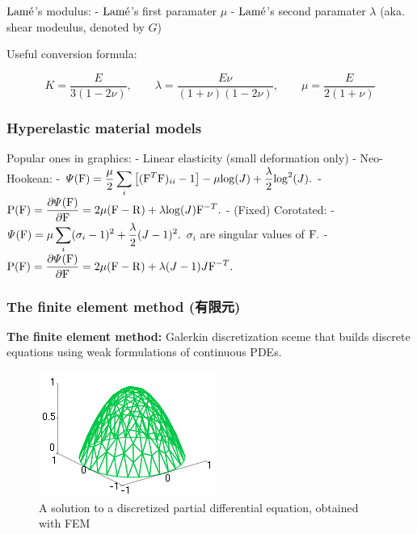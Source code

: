 \documentclass[11pt]{article}
\begin{document}
\(\rm Lam\acute{e}\)'s modulus: - \(\rm Lam\acute{e}\)'s first paramater
\(\mu\) - \(\rm Lam\acute{e}\)'s second paramater \(\lambda\) (aka.
shear modeulus, denoted by \(G\))

Useful conversion formula:

\begin{equation*}
K=\displaystyle\frac{E}{3(1-2\nu)},\qquad \lambda=\displaystyle\frac{E\nu}{(1+\nu)(1-2\nu)},\qquad \mu=\displaystyle\frac{E}{2(1+\nu)}
\end{equation*}

\hypertarget{hyperelastic-material-models}{%
\subsubsection{Hyperelastic material
models}\label{hyperelastic-material-models}}

Popular ones in graphics: - Linear elasticity (small deformation only) -
Neo-Hookean: -
\(\varPsi({\rm F})=\displaystyle\frac{\mu}{2}\sum_{i}  \left[({\rm F}^{T}{\rm F})_{ii}-1\right]  -\mu{\rm log}(J)+\displaystyle\frac{\lambda}{2}{\rm log}^{2}(J).\)
-
\({\rm P(F)}=\displaystyle\frac{\partial\varPsi({\rm F})}{\partial {\rm F}}  =2\mu({\rm F-R})+\lambda{\rm log}(J){\rm F}^{-T}.\)
- (Fixed) Corotated: -
\(\varPsi({\rm F})=\displaystyle\mu\sum_{i}  (\sigma_{i}-1)^{2}+\displaystyle\frac{\lambda}{2}(J-1)^{2}.\)
\(\sigma_{i}\) are singular values of \({\rm F}.\) -
\({\rm P(F)}=\displaystyle\frac{\partial\varPsi({\rm F})}{\partial {\rm F}}  =2\mu({\rm F-R})+\lambda(J-1)J{\rm F}^{-T}.\)

\hypertarget{the-finite-element-method-ux6709ux9650ux5143}{%
\subsubsection{The finite element method
(有限元)}\label{the-finite-element-method-ux6709ux9650ux5143}}

\textbf{The finite element method:} Galerkin discretization sceme that
builds discrete equations using weak formulations of continuous PDEs.

\begin{figure}
\centering
\includegraphics{Finite_element_solution.png}
\caption{A solution to a discretized partial differential equation,
obtained with FEM}
\end{figure}
\end{document}
